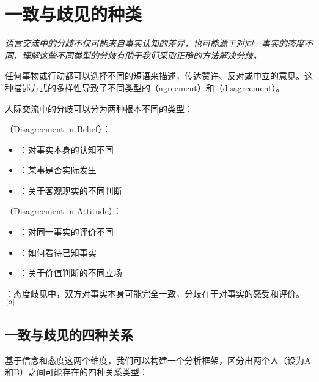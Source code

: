 \section{一致与歧见的种类}

\begin{logicbox}[title=引言]
\textit{语言交流中的分歧不仅可能来自事实认知的差异，也可能源于对同一事实的态度不同，理解这些不同类型的分歧有助于我们采取正确的方法解决分歧。}
\end{logicbox}

任何事物或行动都可以选择不同的短语来描述，传达赞许、反对或中立的意见。这种描述方式的多样性导致了不同类型的（agreement）和（disagreement）。

\begin{theorembox}[title=歧见的基本分类]
人际交流中的分歧可以分为两种根本不同的类型：

（Disagreement in Belief）：
\begin{itemize}
  \item {}：对事实本身的认知不同
  \item {}：某事是否实际发生
  \item {}：关于客观现实的不同判断
\end{itemize}

（Disagreement in Attitude）：
\begin{itemize}
  \item {}：对同一事实的评价不同
  \item {}：如何看待已知事实
  \item {}：关于价值判断的不同立场
\end{itemize}

：态度歧见中，双方对事实本身可能完全一致，分歧在于对事实的感受和评价。$^{[9]}$
\end{theorembox}

\subsection{一致与歧见的四种关系}

基于信念和态度这两个维度，我们可以构建一个分析框架，区分出两个人（设为A和B）之间可能存在的四种关系类型：


